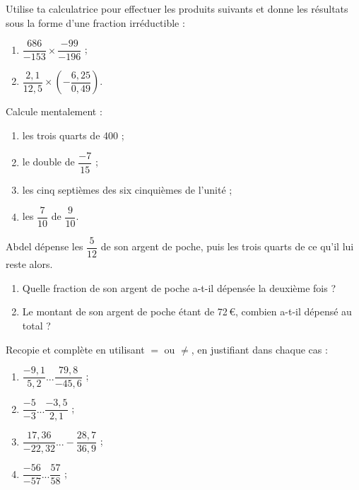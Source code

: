 \begin{exercice}
Utilise ta calculatrice pour effectuer les produits suivants et donne les résultats sous la forme d'une fraction irréductible :
\begin{enumerate}
\item $\dfrac{686}{-153} \times \dfrac{-99}{-196}$ ; 
\item $\dfrac{2,1}{12,5} \times \left(-\dfrac{6,25}{0,49}\right)$.
\end{enumerate}
\end{exercice}



\begin{exercice}
Calcule mentalement :
\begin{enumerate}
\item les trois quarts de 400 ;
\item le double de $\dfrac{-7}{15}$ ;
\item les cinq septièmes des six cinquièmes de l'unité ;
\item les $\dfrac{7}{10}$ de $\dfrac{9}{10}$.
\end{enumerate}
\end{exercice}




\begin{exercice}[Dépense]
Abdel dépense les $\dfrac{5}{12}$ de son argent de poche, puis les trois quarts de ce qu'il lui reste alors.
\begin{enumerate}
\item Quelle fraction de son argent de poche a-t-il dépensée la deuxième fois ?
\item Le montant de son argent de poche étant de 72\,€, combien a-t-il dépensé au total ?
\end{enumerate}
\end{exercice}


\newpage
\begin{exercice}
Recopie et complète en utilisant $=$ ou $\neq$, en justifiant dans chaque cas :
\begin{enumerate}
\item $\dfrac{-9,1}{5,2} ... \dfrac{79,8}{-45,6}$ ;
\item $\dfrac{-5}{-3} ... \dfrac{-3,5}{2,1}$ ;
\item $\dfrac{17,36}{-22,32} ... -\dfrac{28,7}{36,9}$ ;
\item $\dfrac{-56}{-57} ... \dfrac{57}{58}$ ;
\end{enumerate}
\end{exercice}





